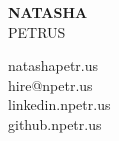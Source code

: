 \documentclass[letterpage]{article}
\begin{document}
\thispagestyle{empty} %
\begin{minipage}[]{0.4\linewidth}
\raggedright
\textbf{\fontsize{37px}{1px}\selectfont\textsf{NATASHA}}\\
\vspace{7px}
{\fontsize{37px}{1px}\selectfont\textsf{PETRUS}}
\end{minipage}
\begin{minipage}{0.01\linewidth}
\end{minipage}
\:\:\:\:\:\:\:\:\:\:\:\:\:\:\:\:\:\: %
\begin{minipage}{0.55\linewidth}
\raggedleft
\vspace{5px} %
natashapetr.us\enspace\faGlobe\\
hire@npetr.us\enspace\faPaperPlane\\
linkedin.npetr.us\enspace\faLinkedin\\
github.npetr.us\enspace\faGithubAlt
\end{minipage}
\vspace{11px}\\
\end{document}
